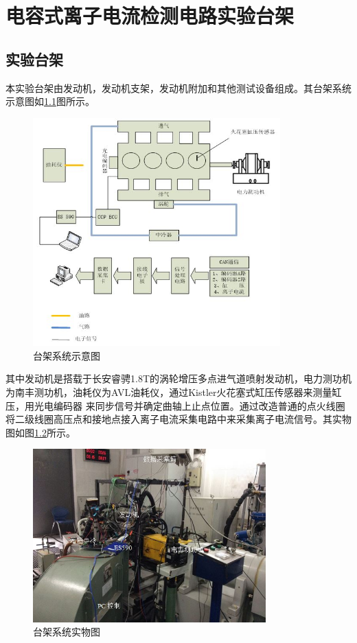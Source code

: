 \chapter{电容式离子电流检测电路实验台架}
\section{实验台架}
本实验台架由发动机，发动机支架，发动机附加和其他测试设备组成。其台架系统示意图如\ref{fig:platformintro}图所示。
\begin{figure}[!h]
	\centering
	\includegraphics[width=0.85\textwidth]{thesis_figure/platformer_chapter/platformer_intro}
	\caption{台架系统示意图}
	\label{fig:platformintro}
\end{figure}
其中发动机是搭载于长安睿骋1.8T的涡轮增压多点进气道喷射发动机，电力测功机为南丰测功机，油耗仪为AVL油耗仪，通过Kistler火花塞式缸压传感器来测量缸压，用光电编码器
来同步信号并确定曲轴上止点位置。通过改造普通的点火线圈将二级线圈高压点和接地点接入离子电流采集电路中来采集离子电流信号。其实物图如图\ref{fig:platformintro_real}所示。
\begin{figure}[t]
	\centering
	\includegraphics[width=0.8\textwidth]{thesis_figure/platformer_chapter/platformer_intro_real}
	\caption{台架系统实物图}
	\label{fig:platformintro_real}
\end{figure}
